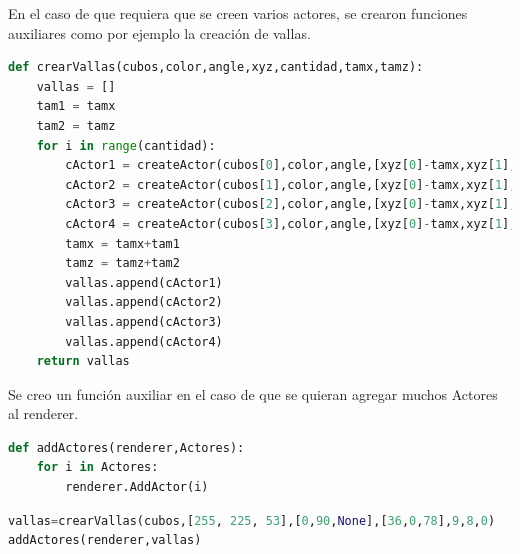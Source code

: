 \documentclass[11pt]{article}
\begin{document}
En el caso de que requiera que se creen varios actores, se crearon funciones auxiliares como por ejemplo la creación de vallas.

\begin{lstlisting}[language=python,frame=single]
def crearVallas(cubos,color,angle,xyz,cantidad,tamx,tamz):
    vallas = []
    tam1 = tamx
    tam2 = tamz
    for i in range(cantidad):
        cActor1 = createActor(cubos[0],color,angle,[xyz[0]-tamx,xyz[1],xyz[2]-tamz])
        cActor2 = createActor(cubos[1],color,angle,[xyz[0]-tamx,xyz[1],xyz[2]-tamz])
        cActor3 = createActor(cubos[2],color,angle,[xyz[0]-tamx,xyz[1],xyz[2]-tamz])
        cActor4 = createActor(cubos[3],color,angle,[xyz[0]-tamx,xyz[1],xyz[2]-tamz])
        tamx = tamx+tam1
        tamz = tamz+tam2
        vallas.append(cActor1)
        vallas.append(cActor2)
        vallas.append(cActor3)
        vallas.append(cActor4)
    return vallas

\end{lstlisting}

Se creo un función auxiliar en el caso de que se quieran agregar muchos Actores al renderer.


\begin{lstlisting}[language=python,frame=single]
def addActores(renderer,Actores):
    for i in Actores:
        renderer.AddActor(i)
\end{lstlisting}

\begin{lstlisting}[language=python,frame=single]
vallas=crearVallas(cubos,[255, 225, 53],[0,90,None],[36,0,78],9,8,0)
addActores(renderer,vallas)
\end{lstlisting}
\end{document}
